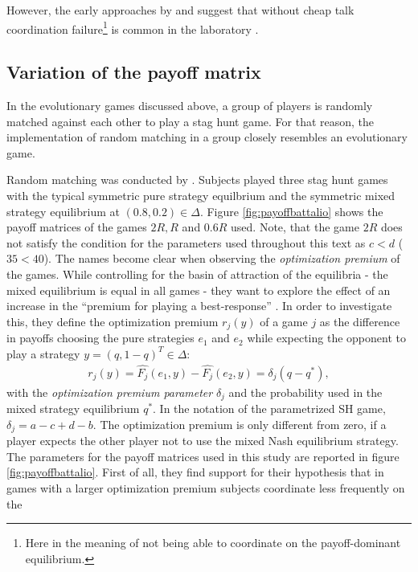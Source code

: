 However, the 
early approaches by \textcite{cooper_communication_1992} and
\textcite{van_huyck_tacit_1990} suggest that without cheap talk 
coordination failure\footnote{Here in the meaning of not being 
able to coordinate on the payoff-dominant equilibrium.} 
is common in the laboratory \parencite[2]{devetag_when_2007}. 

\subsection{Variation of the payoff matrix}
In the evolutionary games discussed above, a group of players is randomly
matched against each other to play a stag hunt game. For that reason, the
implementation of random matching in a group closely resembles an 
evolutionary game.

Random matching was conducted by \textcite{battalio_optimization_2001}. 
Subjects played three stag hunt games with the typical symmetric pure strategy
equilbrium and the symmetric mixed strategy equilibrium at $(0.8,0.2) \in
\Delta$. Figure \ref{fig:payoffbattalio} shows the payoff matrices of the
games $2R, R$ and $0.6R$ used. Note, that the game $2R$ does not satisfy the
condition for the parameters used throughout this text as $c<d$ ($35<40$).
The names become clear when observing the 
\textit{optimization premium} of the games. While controlling for the basin of 
attraction of the equilibria - the mixed equilibrium is equal in all games -
they want to explore the effect of an increase in the ``premium for playing
a best-response'' \parencite[751]{battalio_optimization_2001}. 
In order to investigate this, they define the optimization premium $r_j(y)$ of 
a game $j$ as the difference in payoffs choosing the pure strategies 
$e_1$ and $e_2$ while expecting the opponent to play a strategy 
$y=(q,1-q)^T \in \Delta$:
\begin{align}
        r_j(y)= \hat{F_j}(e_1,y) - \hat{F_j}(e_2,y) = \delta_j(q-q^*),
\end{align}
with the \textit{optimization premium parameter} $\delta_j$ and the 
probability used in the mixed strategy equilibrium $q^*$. In the notation
of the parametrized SH game, $\delta_j = a - c + d - b$. The optimization
premium is only different from zero, if a player expects the other player not
to use the mixed Nash equilibrium strategy.
The parameters for the payoff matrices used in this study 
are reported in figure \ref{fig:payoffbattalio}. 
First of all, they find support for their hypothesis that in games with a 
larger optimization premium subjects coordinate less frequently on the 
